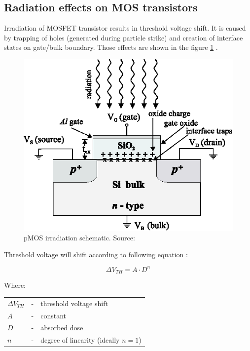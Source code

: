     \subsection{Radiation effects on MOS transistors}
    \label{Radiation_effects_on_MOS_transistors}
        Irradiation of MOSFET transistor results in threshold voltage shift. It is caused by trapping of holes (generated during particle strike) and creation of interface states on gate/bulk boundary. Those effects are shown in the figure \ref{MOS_irradiation} \cite{pMOS_dosimeters_radfets}.

        \begin{figure}[H]
            \centering
            \includegraphics[width=0.4\paperwidth]{img/03/MOS_irradiation_schematic.eps}
            \caption{pMOS irradiation schematic. Source: \cite{pMOS_dosimeters_radfets}}
            \label{MOS_irradiation}
        \end{figure}

        Threshold voltage will shift according to following equation \cite{pMOS_dosimeters_radfets}:

        $$\Delta V_{TH} = A \cdot D^n$$

        Where:

        \begin{tabular}{lcl}
            $\Delta V_{TH}$ & - & threshold voltage shift \\
            $A$ & - & constant \\
            $D$ & - & absorbed dose \\
            $n$ & - & degree of linearity (ideally $n = 1$) \\
        \end{tabular}
        \bigskip



